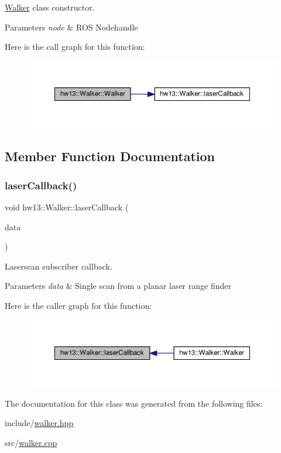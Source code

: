 \hyperlink{classhw13_1_1_walker}{Walker} class constructor. 


\begin{DoxyParams}{Parameters}
{\em node} & R\+OS Nodehandle \\
\hline
\end{DoxyParams}
Here is the call graph for this function\+:\nopagebreak
\begin{figure}[H]
\begin{center}
\leavevmode
\includegraphics[width=350pt]{classhw13_1_1_walker_a719ac99378e3ddf07b4811058018208d_cgraph}
\end{center}
\end{figure}


\subsection{Member Function Documentation}
\mbox{\label{classhw13_1_1_walker_a5675ccfb58c0e78adfad582d840e8f42}} 
\subsubsection{\texorpdfstring{laser\+Callback()}{laserCallback()}}
{\footnotesize\ttfamily void hw13\+::\+Walker\+::laser\+Callback (\begin{DoxyParamCaption}\item[{const sensor\+\_\+msgs\+::\+Laser\+Scan\+::\+Const\+Ptr \&}]{data }\end{DoxyParamCaption})}



Laserscan subscriber callback. 


\begin{DoxyParams}{Parameters}
{\em data} & Single scan from a planar laser range finder \\
\hline
\end{DoxyParams}
Here is the caller graph for this function\+:\nopagebreak
\begin{figure}[H]
\begin{center}
\leavevmode
\includegraphics[width=350pt]{classhw13_1_1_walker_a5675ccfb58c0e78adfad582d840e8f42_icgraph}
\end{center}
\end{figure}


The documentation for this class was generated from the following files\+:\begin{DoxyCompactItemize}
\item 
include/\hyperlink{walker_8hpp}{walker.\+hpp}\item 
src/\hyperlink{walker_8cpp}{walker.\+cpp}\end{DoxyCompactItemize}

